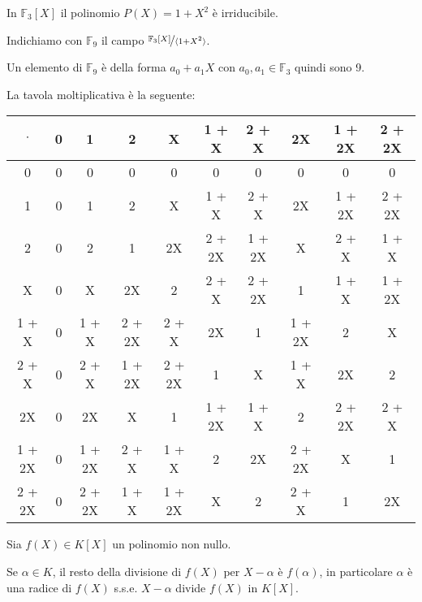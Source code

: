 \documentclass[../main.tex]{subfiles}
\begin{document}
\begin{example}
    In $\mathbb{F}_3[X]$ il polinomio $P(X) = 1 + X^2$ è irriducibile.

    Indichiamo con $\mathbb{F}_9$ il campo $\nicefrac{\mathbb{F}_3[X]}{\langle1 + X^2\rangle}$.

    Un elemento di $\mathbb{F}_9$ è della forma $a_0 + a_1X$ con $a_0,a_1 \in \mathbb{F}_3$ quindi sono 9.

    La tavola moltiplicativa è la seguente:
    \begin{center}
        \begin{tabular}{c|c|c|c|c|c|c|c|c|c}
            $\cdot$ & 0 & 1      & 2      & X      & 1 + X  & 2 + X  & 2X     & 1 + 2X & 2 + 2X \\
            \hline
            0       & 0 & 0      & 0      & 0      & 0      & 0      & 0      & 0      & 0      \\
            \hline
            1       & 0 & 1      & 2      & X      & 1 + X  & 2 + X  & 2X     & 1 + 2X & 2 + 2X \\
            \hline
            2       & 0 & 2      & 1      & 2X     & 2 + 2X & 1 + 2X & X      & 2 + X  & 1 + X  \\
            \hline
            X       & 0 & X      & 2X     & 2      & 2 + X  & 2 + 2X & 1      & 1 + X  & 1 + 2X \\
            \hline
            1 + X   & 0 & 1 + X  & 2 + 2X & 2 + X  & 2X     & 1      & 1 + 2X & 2      & X      \\
            \hline
            2 + X   & 0 & 2 + X  & 1 + 2X & 2 + 2X & 1      & X      & 1 + X  & 2X     & 2      \\
            \hline
            2X      & 0 & 2X     & X      & 1      & 1 + 2X & 1 + X  & 2      & 2 + 2X & 2 + X  \\
            \hline
            1 + 2X  & 0 & 1 + 2X & 2 + X  & 1 + X  & 2      & 2X     & 2 + 2X & X      & 1      \\
            \hline
            2 + 2X  & 0 & 2 + 2X & 1 + X  & 1 + 2X & X      & 2      & 2 + X  & 1      & 2X     \\
        \end{tabular}
    \end{center}
\end{example}

\begin{theorem}[di Ruffini]
    Sia $f(X) \in K[X]$ un polinomio non nullo.

    Se $\alpha \in K$, il resto della divisione di $f(X)$ per $X - \alpha$ è $f(\alpha)$, in particolare $\alpha$ è una radice di $f(X)$ s.s.e. $X - \alpha$ divide $f(X)$ in $K[X]$.
\end{theorem}
\end{document}
